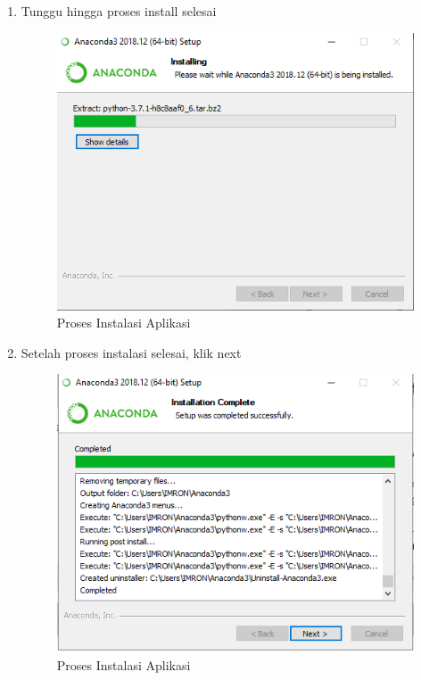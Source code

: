 \begin{enumerate}
\item Tunggu hingga proses install selesai
\begin{figure}[ht]
\centering
\includegraphics[scale=0.7]{figures/7.png}
\caption{Proses Instalasi Aplikasi}
\end{figure}

\item Setelah proses instalasi selesai, klik next
\begin{figure}[ht]
\centering
\includegraphics[scale=0.7]{figures/8.png}
\caption{Proses Instalasi Aplikasi}
\end{figure}


\end{enumerate}
